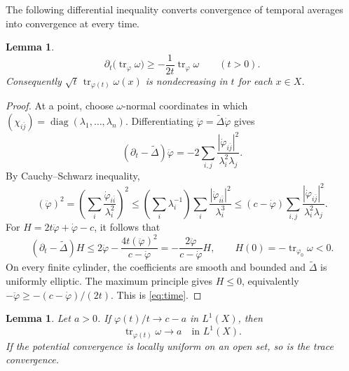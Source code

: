 \documentclass[reqno]{amsart}
\numberwithin{equation}{section}
\newtheorem{lemma}[theorem]{Lemma}
\theoremstyle{definition}
\DeclareMathOperator{\tr}{tr}
\begin{document}
The following differential inequality converts convergence of temporal
averages into convergence at every time.
\begin{lemma}\label{lem:time}
\begin{equation}\label{eq:time}
 \partial_t\bigl(\tr_{\varphi}\omega\bigr)
 \ge-\frac1{2t}\tr_{\varphi}\omega
 \qquad(t>0).
\end{equation}
Consequently $\sqrt t\,\tr_{\varphi(t)}\omega(x)$ is
nondecreasing in $t$ for each $x\in X$.
\end{lemma}
\begin{proof}
At a point, choose $\omega$-normal coordinates in which
$(\chi_{i\bar j})=\operatorname{diag}(\lambda_1,\ldots,\lambda_n)$.
Differentiating $\ddot\varphi=\widetilde\Delta\dot\varphi$ gives
\[
 (\partial_t-\widetilde\Delta)\ddot\varphi
 =-2\sum_{i,j}\frac{|\dot\varphi_{i\bar j}|^2}{\lambda_i^2\lambda_j}.
\]
By Cauchy--Schwarz inequality,
\[
 (\ddot\varphi)^2
 =\left(\sum_i\frac{\dot\varphi_{i\bar i}}{\lambda_i^2}\right)^2
 \le\left(\sum_i\lambda_i^{-1}\right)
          \sum_i\frac{|\dot\varphi_{i\bar i}|^2}{\lambda_i^3}
 \le(c-\dot\varphi)\sum_{i,j}
          \frac{|\dot\varphi_{i\bar j}|^2}{\lambda_i^2\lambda_j}.
\]
For $H=2t\ddot\varphi+\dot\varphi-c$, it follows that
\[
 (\partial_t-\widetilde\Delta)H
 \le2\ddot\varphi-\frac{4t(\ddot\varphi)^2}{c-\dot\varphi}
 =-\frac{2\ddot\varphi}{c-\dot\varphi}H,\qquad
 H(0)=-\tr_{\varphi_0}\omega<0.
\]
On every finite cylinder, the coefficients are smooth and bounded and
$\widetilde\Delta$ is uniformly elliptic. The maximum principle gives
$H\le0$, equivalently
$-\ddot\varphi\ge-(c-\dot\varphi)/(2t)$. This is \eqref{eq:time}.
\end{proof}
\begin{lemma}\label{lem:trace-limit}
Let $a>0$. If $\varphi(t)/t\to c-a$ in $L^1(X)$, then
\[
 \tr_{\varphi(t)}\omega\longrightarrow a
 \quad\text{in }L^1(X).
\]
If the potential convergence is locally uniform on an open set, so is
the trace convergence.
\end{lemma}
\end{document}
